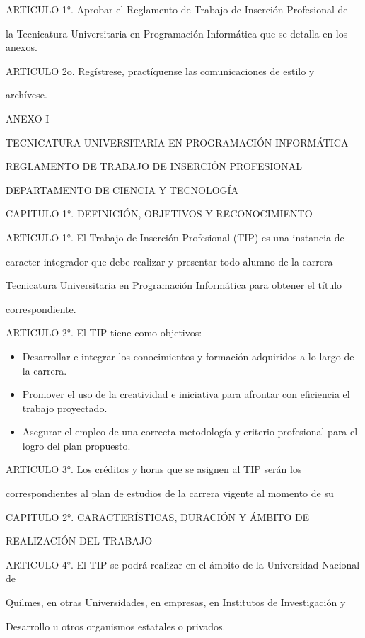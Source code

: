 \documentclass[a4paper,12pt]{article}
\begin{document}
ARTICULO 1°. Aprobar el Reglamento de Trabajo de Inserción Profesional de

la Tecnicatura Universitaria en Programación Informática que se detalla en los anexos.

ARTICULO 2o. Regístrese, practíquense las comunicaciones de estilo y

archívese.

ANEXO I

TECNICATURA UNIVERSITARIA EN PROGRAMACIÓN INFORMÁTICA

REGLAMENTO DE TRABAJO DE INSERCIÓN PROFESIONAL

DEPARTAMENTO DE CIENCIA Y TECNOLOGÍA

CAPITULO 1°. DEFINICIÓN, OBJETIVOS Y RECONOCIMIENTO

ARTICULO 1°. El Trabajo de Inserción Profesional (TIP) es una instancia de

caracter integrador que debe realizar y presentar todo alumno de la carrera

Tecnicatura Universitaria en Programación Informática para obtener el título

correspondiente.

ARTICULO 2°. El TIP tiene como objetivos:

\begin{itemize}
 \item Desarrollar e integrar los conocimientos y formación adquiridos a lo
 largo de la carrera.
 \item Promover el uso de la creatividad e iniciativa para afrontar con
 eficiencia el trabajo proyectado.
 \item Asegurar el empleo de una correcta metodología y criterio
 profesional para el logro del plan propuesto.
\end{itemize}

ARTICULO 3°. Los créditos y horas que se asignen al TIP serán los

correspondientes al plan de estudios de la carrera vigente al momento de su

CAPITULO 2°. CARACTERÍSTICAS, DURACIÓN Y ÁMBITO DE

REALIZACIÓN DEL TRABAJO

ARTICULO 4°. El TIP se podrá realizar en el ámbito de la Universidad Nacional de

Quilmes, en otras Universidades, en empresas, en Institutos de Investigación y

Desarrollo u otros organismos estatales o privados. 
\end{document}
